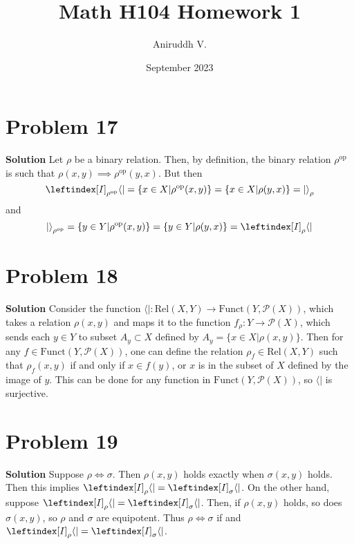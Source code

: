 \documentclass{article}
\title{Math H104 Homework 1}
\author{Aniruddh V.}
\date{September 2023}
\begin{document}
\maketitle

\section{Problem 17}

\textbf{Solution } Let $\rho$ be a binary relation. Then, by definition, the binary relation $\rho^{\text{op}}$ is such that $\rho(x, y) \implies \rho^{\text{op}}(y, x)$. But then
\[ \leftindex[I]_{\rho^{\text{op}}} {\langle \rvert} = \{x \in X | \rho^{\text{op}}(x, y) \} = \{x \in X | \rho(y, x)\} = {\lvert \rangle}_{\rho}\] and 
\[  {\lvert \rangle}_{\rho^{\text{op}}} = \{ y \in Y | \rho^{\text{op}}(x, y) \} = \{ y \in Y | \rho(y,x )\} = \leftindex[I]_{\rho} {\langle \rvert}\]

\section{Problem 18}

\textbf{Solution } Consider the function ${\langle \rvert} : \text{Rel}(X, Y) \to \text{Funct}(Y, \mathcal{P}(X))$, which takes a relation $\rho(x, y)$ and maps it to the function
$f_\rho : Y \to \mathcal{P}(X)$, which sends each $y \in Y$ to subset $A_y \subset X$ defined by $A_y = \{x \in X | \rho(x, y)\}$. Then for any $f \in \text{Funct}(Y, \mathcal{P}(X))$,
one can define the relation $\rho_f \in \text{Rel}(X, Y)$ such that $\rho_f (x, y)$ if and only if $x \in f(y)$, or $x$ is in the subset of $X$ defined by the image of $y$. This can be done
for any function in $\text{Funct}(Y, \mathcal{P}(X))$, so ${\langle \rvert}$ is surjective.

\section{Problem 19}

\textbf{Solution } Suppose $\rho \iff \sigma$. Then $\rho(x, y)$ holds exactly when $\sigma(x, y)$ holds. Then this implies $\leftindex[I]_{\rho} {\langle \rvert} = \leftindex[I]_{\sigma} {\langle \rvert}$.
On the other hand, suppose  $\leftindex[I]_{\rho} {\langle \rvert} = \leftindex[I]_{\sigma} {\langle \rvert}$. Then, if $\rho(x, y)$ holds, so does $\sigma(x, y)$, so $\rho$ and $\sigma$ are equipotent. Thus
$\rho \iff \sigma$ if and $\leftindex[I]_{\rho} {\langle \rvert} = \leftindex[I]_{\sigma} {\langle \rvert}$.
\end{document}
